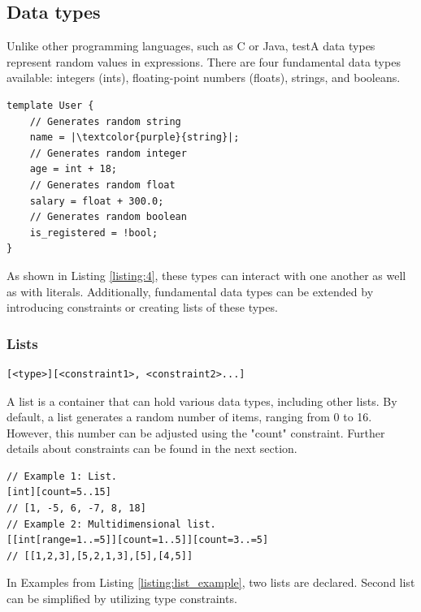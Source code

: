 \documentclass[11pt,a4paper]{article}
\begin{document}
    \subsection{Data types}
    \par Unlike other programming languages, such as C or Java, testA data types represent random values in expressions. 
    There are four fundamental data types available: integers (ints), floating-point numbers (floats), strings, and booleans.
    \begin{listing}[h]
        \begin{verbatim}
template User {
    // Generates random string
    name = |\textcolor{purple}{string}|; 
    // Generates random integer
    age = int + 18; 
    // Generates random float
    salary = float + 300.0; 
    // Generates random boolean
    is_registered = !bool; 
}
        \end{verbatim}
        \caption{Template with data types}
        \label{listing:4}
    \end{listing}
    \par As shown in Listing \ref{listing:4}, these types can interact with one another as well as with 
    literals. Additionally, fundamental data types can be extended by introducing constraints or creating 
    lists of these types.
    \subsubsection{Lists}
        \begin{listing}[h]
        \begin{verbatim}
[<type>][<constraint1>, <constraint2>...]  
        \end{verbatim}
        \caption{List type}
        \centering
        \label{declaration:list}
    \end{listing}
    \par A list is a container that can hold various data types, including other lists. By default, a list generates a 
    random number of items, ranging from 0 to 16. However, this number can be adjusted using the "count" constraint. 
    Further details about constraints can be found in the next section.
    \begin{listing}[h]
        \begin{verbatim}
// Example 1: List.
[int][count=5..15] 
// [1, -5, 6, -7, 8, 18]
// Example 2: Multidimensional list.
[[int[range=1..=5]][count=1..5]][count=3..=5]  
// [[1,2,3],[5,2,1,3],[5],[4,5]]
        \end{verbatim}
        \caption{List examples}
        \centering
    \label{listing:list_example}
    \end{listing}
    \par In Examples from Listing \ref{listing:list_example}, two lists are declared. Second list can be 
    simplified by utilizing type constraints.
\end{document}
